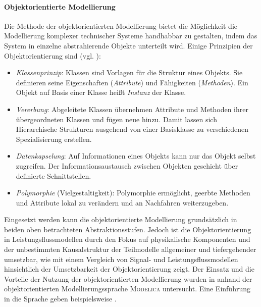 \paragraph{Objektorientierte Modellierung} Die Methode der objektorientierten Modellierung bietet die Möglichkeit die Modellierung komplexer technischer Systeme handhabbar zu gestalten, indem das System in einzelne abstrahierende Objekte unterteilt wird. Einige Prinzipien der Objektorientierung sind (vgl. \cite{notgesObjektorientierteModellierungSimulation2007}):\begin{itemize}
	\item \emph{Klassenprinzip}: Klassen sind Vorlagen für die Struktur eines Objekts. Sie definieren seine Eigenschaften (\emph{Attribute}) und Fähigkeiten (\emph{Methoden}). Ein Objekt auf Basis einer Klasse heißt \emph{Instanz} der Klasse.
	\item \emph{Vererbung}: Abgeleitete Klassen übernehmen Attribute und Methoden ihrer übergeordneten Klassen und fügen neue hinzu. Damit lassen sich Hierarchische Strukturen ausgehend von einer Basisklasse zu verschiedenen Spezialisierung erstellen.
	\item \emph{Datenkapselung}: Auf Informationen eines Objekts kann nur das Objekt selbst zugreifen. Der Informationsaustausch zwischen Objekten geschieht über definierte Schnittstellen.
	\item \emph{Polymorphie} (Vielgestaltigkeit): Polymorphie ermöglicht, geerbte Methoden und Attribute lokal zu verändern und an Nachfahren weiterzugeben.
\end{itemize}

Eingesetzt werden kann die objektorientierte Modellierung grundsätzlich in beiden oben betrachteten Abstraktionsstufen. Jedoch ist die Objektorientierung in Leistungsflussmodellen durch den Fokus auf physikalische Komponenten und der unbestimmten Kausalstruktur der Teilmodelle allgemeiner und tiefergehender umsetzbar, wie \cite[S.~1292-1327]{schroderElektrischeAntriebeRegelung2015} mit einem Vergleich von Signal- und Leistungsflussmodellen hinsichtlich der Umsetzbarkeit der Objektorientierung zeigt. Der Einsatz und die Vorteile der Nutzung der objektorientierten Modellierung wurden in \cites{gesenhuesObjektorientiertmodellbasierteCharakterisierungUberwachung2019,notgesObjektorientierteModellierungSimulation2007} anhand der objektorientierten Modellierungssprache \textsc{Modelica} untersucht. Eine Einführung in die Sprache geben beispielsweise \cites{kralModelicaObjektorientierteModellbildung2019,fritzsonIntroductionObjectOrientedModeling,tillerModelicaExample2014}.

